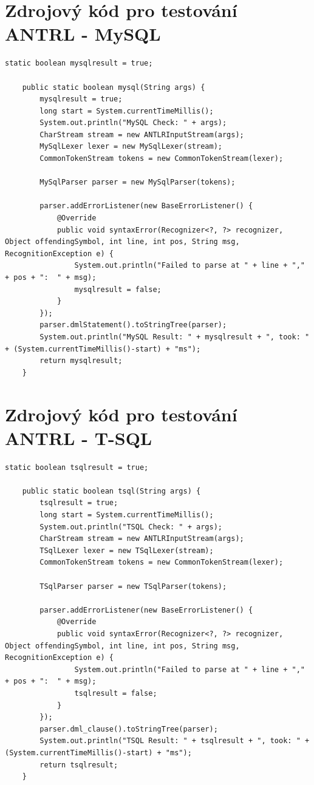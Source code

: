 \documentclass[czech,bachelor,public,dept460,male,cpdeclaration,twoside]{diploma}
\begin{document}
\section{Zdrojový kód pro testování ANTRL - MySQL}
\begin{lstlisting}[caption=ANTRL MySQL]
    static boolean mysqlresult = true;

    public static boolean mysql(String args) {
        mysqlresult = true;
        long start = System.currentTimeMillis();
        System.out.println("MySQL Check: " + args);
        CharStream stream = new ANTLRInputStream(args);
        MySqlLexer lexer = new MySqlLexer(stream);
        CommonTokenStream tokens = new CommonTokenStream(lexer);

        MySqlParser parser = new MySqlParser(tokens);

        parser.addErrorListener(new BaseErrorListener() {
            @Override
            public void syntaxError(Recognizer<?, ?> recognizer, Object offendingSymbol, int line, int pos, String msg, RecognitionException e) {
                System.out.println("Failed to parse at " + line + "," + pos + ":  " + msg);
                mysqlresult = false;
            }
        });
        parser.dmlStatement().toStringTree(parser);
        System.out.println("MySQL Result: " + mysqlresult + ", took: " + (System.currentTimeMillis()-start) + "ms");
        return mysqlresult;
    }
\end{lstlisting}
\section{Zdrojový kód pro testování ANTRL - T-SQL}
\begin{lstlisting}[caption=ANTRL T-SQL]
  static boolean tsqlresult = true;

    public static boolean tsql(String args) {
        tsqlresult = true;
        long start = System.currentTimeMillis();
        System.out.println("TSQL Check: " + args);
        CharStream stream = new ANTLRInputStream(args);
        TSqlLexer lexer = new TSqlLexer(stream);
        CommonTokenStream tokens = new CommonTokenStream(lexer);
        
        TSqlParser parser = new TSqlParser(tokens);

        parser.addErrorListener(new BaseErrorListener() {
            @Override
            public void syntaxError(Recognizer<?, ?> recognizer, Object offendingSymbol, int line, int pos, String msg, RecognitionException e) {
                System.out.println("Failed to parse at " + line + "," + pos + ":  " + msg);
                tsqlresult = false;
            }
        });
        parser.dml_clause().toStringTree(parser);
        System.out.println("TSQL Result: " + tsqlresult + ", took: " + (System.currentTimeMillis()-start) + "ms");
        return tsqlresult;
    }
\end{lstlisting}
\end{document}
